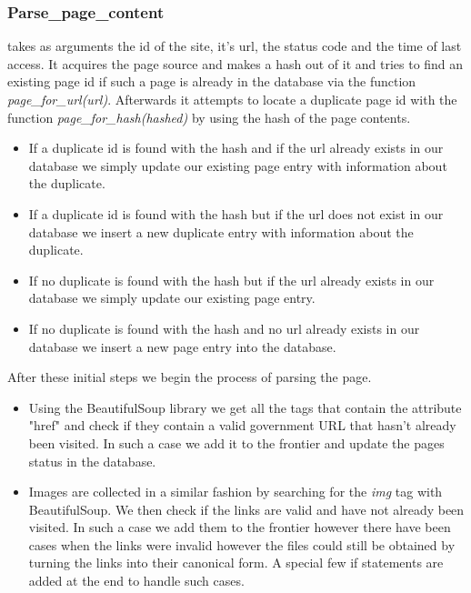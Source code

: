 \documentclass[runningheads]{llncs}
\begin{document}
\subsubsection{Parse\_page\_content}
takes as arguments the id of the site, it's url, the status code and the time of last access. It acquires the page source and makes a hash out of it and tries to find an existing page id if such a page is already in the database via the function \textit{page\_for\_url(url)}. Afterwards it attempts to locate a duplicate page id with the function \textit{page\_for\_hash(hashed)} by using the hash of the page contents. 
\begin{itemize}
  \item If a duplicate id is found with the hash and if the url already exists in our database we simply update our existing page entry with information about the duplicate.
  \item If a duplicate id is found with the hash but if the url does not exist in our database we insert a new duplicate entry with information about the duplicate.
  \item If no duplicate is found with the hash but if the url already exists in our database we simply update our existing page entry.
  \item If no duplicate is found with the hash and no url already exists in our database we insert a new page entry into the database.
\end{itemize}
After these initial steps we begin the process of parsing the page.
\begin{itemize}
\item Using the BeautifulSoup library we get all the tags that contain the attribute "href" and check if they contain a valid government URL that hasn't already been visited. In such a case we add it to the frontier and update the pages status in the database.
\item Images are collected in a similar fashion by searching for the \textit{img} tag with BeautifulSoup. We then check if the links are valid and have not already been visited. In such a case we add them to the frontier however there have been cases when the links were invalid however the files could still be obtained by turning the links into their canonical form. A special few if statements are added at the end to handle such cases.
\end{itemize}
\end{document}
